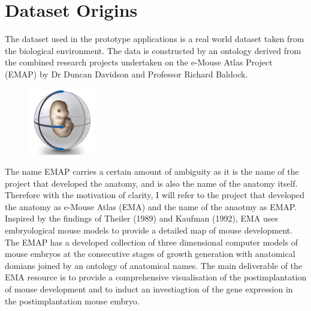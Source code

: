 \chapter{Dataset Origins}
The dataset used in the prototype applications is a real world dataset taken from the biological environment. The data is constructed by an ontology derived from the combined research projects undertaken on the e-Mouse Atlas Project (EMAP) by Dr Duncan Davidson and Professor Richard Baldock.\begin{figure}\includegraphics[width=0.9\linewidth]{images/ema_logo}\end{figure} The name EMAP carries a certain amount of ambiguity as it is the name of the project that developed the anatomy, and is also the name of the anatomy itself. Therefore with the motivation of clarity, I will refer to the project that developed the anatomy as e-Mouse Atlas (EMA) and the name of the anaotmy as EMAP. Inspired by the findings of Theiler (1989) and Kaufman (1992), EMA uses embryological mouse models to provide a detailed map of mouse development. The EMAP has a developed collection of three dimensional computer models of mouse embryos at the consecutive stages of growth generation with anatomical domians joined by an ontology of anatomical names. The main deliverable of the EMA resource is to provide a comprehensive visualisation of the postimplantation of mouse development and to induct an investiagtion of the gene expression in the postimplantation mouse embryo.


